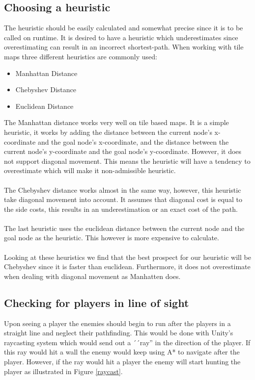 \subsection*{Choosing a heuristic}
The heuristic should be easily calculated and somewhat precise since it is to be called on runtime.
It is desired to have a heuristic which underestimates since overestimating can result in an incorrect shortest-path.
When working with tile maps three different heuristics are commonly used\cite{heuristics}:
\begin{itemize}
\item Manhattan Distance
\item Chebyshev Distance
\item Euclidean Distance
\end{itemize}
The Manhattan distance works very well on tile based maps. 
It is a simple heuristic, it works by adding the distance between the current node's x-coordinate and the goal node's x-coordinate, and the distance between the current node's y-coordinate and the goal node's y-coordinate.
However, it does not support diagonal movement. 
This means the heuristic will have a tendency to overestimate which will make it non-admissible heuristic.\\\\
The Chebyshev distance works almost in the same way, however, this heuristic take diagonal movement into account. 
It assumes that diagonal cost is equal to the side costs, this results in an underestimation or an exact cost of the path.\\\\
The last heuristic uses the euclidean distance between the current node and the goal node as the heuristic.
This however is more expensive to calculate.\\\\
Looking at these heuristics we find that the best prospect for our heuristic will be Chebyshev since it is faster than euclidean. 
Furthermore, it does not overestimate when dealing with diagonal movement as Manhatten does.

\subsection*{Checking for players in line of sight}
Upon seeing a player the enemies should begin to run after the players in a straight line and neglect their pathfinding. 
This would be done with Unity's raycasting system which would send out a ´´ray'' in the direction of the player. 
If this ray would hit a wall the enemy would keep using A* to navigate after the player.
However, if the ray would hit a player the enemy will start hunting the player as illustrated in Figure \ref{raycast}.

